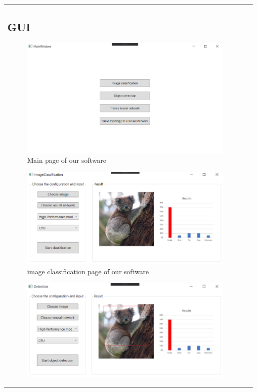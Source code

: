 \documentclass[parskip=full]{scrartcl}
\begin{document}
\begin{tabular}{p{2cm}p{12cm}}
\subsection{GUI}
\begin{figure}[htb!]\centering
\includegraphics[width=\textwidth]{MainPageGUI}
\caption{Main page of our software}
\end{figure}
\begin{figure}[htb!]\centering
\includegraphics[width=\textwidth]{ImageClassificationGUI}
\caption{\gls{image classification} page of our software}
\end{figure}
\begin{figure}[htb!]\centering
\includegraphics[width=\textwidth]{DetectionGUI}

\end{figure}
\end{tabular}
\end{document}
